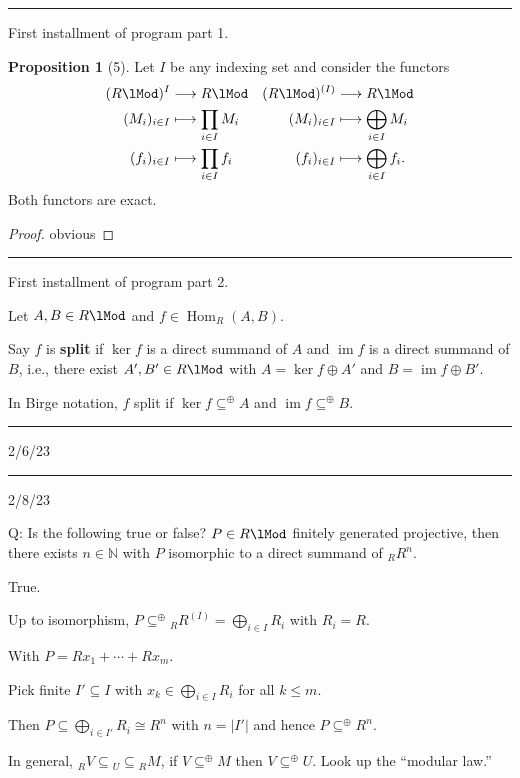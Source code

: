 \documentclass[12pt]{article}
\newcommand{\keyword}[1]{\textbf{#1}}
\newcommand{\sepline}{\rule{\textwidth}{0.4pt}}
\theoremstyle{definition}
\newtheorem{proposition}{Proposition}
\newcommand{\N}{\mathbb{N}}
\newcommand{\<}{\left\langle}
\renewcommand{\>}{\right\rangle}
\newcommand{\iso}{\cong}
\newcommand{\seq}{\subseteq}
\newcommand{\To}{\longrightarrow}
\newcommand{\Mapsto}{\longmapsto}
\DeclareMathOperator{\Hom}{Hom}
\DeclareMathOperator{\im}{im}
\renewcommand{\_}[1]{{_{#1}}}
\begin{document}
\sepline

First installment of program part 1.

\begin{proposition}[5]
    Let $I$ be any indexing set and consider the functors
    \begin{align*}
        (R\lMod)^I &\To R\lMod 
            & (R\lMod)^{(I)} &\To R\lMod \\
        (M_i)_{i \in I} &\Mapsto \prod_{i \in I} M_i 
            & (M_i)_{i \in I} &\Mapsto \bigoplus_{i \in I} M_i \\
        (f_i)_{i \in I} &\Mapsto \prod_{i \in I} f_i
            & (f_i)_{i \in I} &\Mapsto \bigoplus_{i \in I} f_i.
    \end{align*}
    Both functors are exact.
\end{proposition}

\begin{proof}
    obvious
\end{proof}

\sepline

First installment of program part 2.

Let $A, B \in R\lMod$ and $f \in \Hom_R(A, B)$.

Say $f$ is \keyword{split} if $\ker f$ is a direct summand of $A$ and $\im f$ is a direct summand of $B$, i.e., there exist $A',B' \in R\lMod$ with $A = \ker f \oplus A'$ and $B = \im f \oplus B'$.

In Birge notation, $f$ split if $\ker f \seq^\oplus A$ and $\im f \seq^\oplus B$.

\sepline

2/6/23

\sepline

2/8/23

Q: Is the following true or false?
$P \in R\lMod$ finitely generated projective, then there exists $n \in \N$ with $P$ isomorphic to a direct summand of $\_RR^n$. 

True.

Up to isomorphism, $P \seq^\oplus \_RR^{(I)} = \bigoplus_{i \in I} R_i$ with $R_i = R$.

With $P = Rx_1 + \cdots + Rx_m$.

Pick finite $I' \seq I$ with $x_k \in \bigoplus_{i \in I} R_i$ for all $k \leq m$.

Then $P \seq \bigoplus_{i \in I'} R_i \iso R^n$ with $n = |I'|$ and hence $P \seq^\oplus R^n$.

In general, $\_RV \seq \_U \seq \_RM$, if $V \seq^\oplus M$ then $V \seq^\oplus U$.
Look up the ``modular law.''
\end{document}
